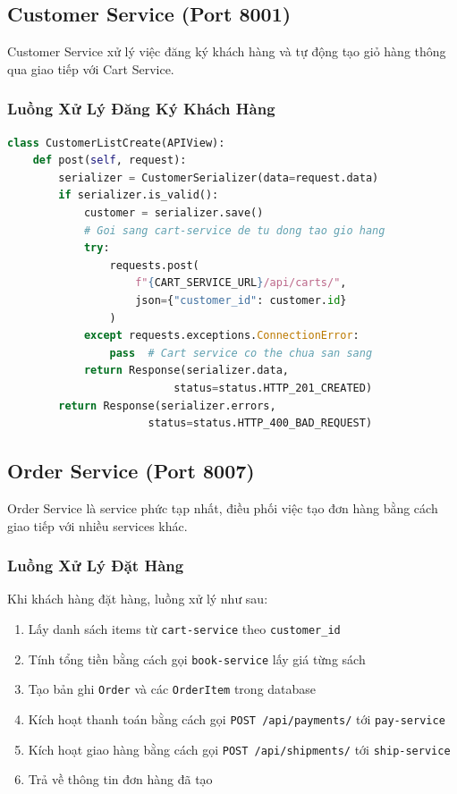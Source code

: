 \documentclass[12pt,a4paper]{article}
\begin{document}
\subsection{Customer Service (Port 8001)}

Customer Service xử lý việc đăng ký khách hàng và tự động tạo giỏ hàng thông qua giao tiếp với Cart Service.

\subsubsection{Luồng Xử Lý Đăng Ký Khách Hàng}

\begin{lstlisting}[language=Python, caption={Tự động tạo giỏ hàng khi đăng ký -- customer-service}]
class CustomerListCreate(APIView):
    def post(self, request):
        serializer = CustomerSerializer(data=request.data)
        if serializer.is_valid():
            customer = serializer.save()
            # Goi sang cart-service de tu dong tao gio hang
            try:
                requests.post(
                    f"{CART_SERVICE_URL}/api/carts/",
                    json={"customer_id": customer.id}
                )
            except requests.exceptions.ConnectionError:
                pass  # Cart service co the chua san sang
            return Response(serializer.data,
                          status=status.HTTP_201_CREATED)
        return Response(serializer.errors,
                      status=status.HTTP_400_BAD_REQUEST)
\end{lstlisting}

\subsection{Order Service (Port 8007)}

Order Service là service phức tạp nhất, điều phối việc tạo đơn hàng bằng cách giao tiếp với nhiều services khác.

\subsubsection{Luồng Xử Lý Đặt Hàng}

Khi khách hàng đặt hàng, luồng xử lý như sau:

\begin{enumerate}[leftmargin=1.5cm]
  \item Lấy danh sách items từ \texttt{cart-service} theo \texttt{customer\_id}
  \item Tính tổng tiền bằng cách gọi \texttt{book-service} lấy giá từng sách
  \item Tạo bản ghi \texttt{Order} và các \texttt{OrderItem} trong database
  \item Kích hoạt thanh toán bằng cách gọi \texttt{POST /api/payments/} tới \texttt{pay-service}
  \item Kích hoạt giao hàng bằng cách gọi \texttt{POST /api/shipments/} tới \texttt{ship-service}
  \item Trả về thông tin đơn hàng đã tạo
\end{enumerate}
\end{document}
